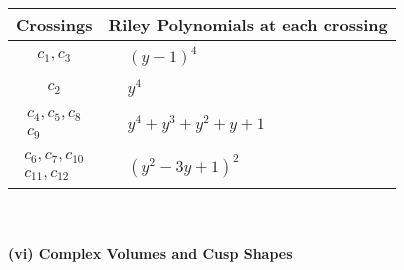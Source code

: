 \documentclass[1p]{elsarticle_modified}
\theoremstyle{definition}
\begin{document}
\begin{tabular}{m{50pt}|m{274pt}}
Crossings & \hspace{64pt}Riley Polynomials at each crossing \\
\hline $$\begin{aligned}c_{1},c_{3}\end{aligned}$$&$\begin{aligned}
&(y-1)^4
\end{aligned}$\\
\hline $$\begin{aligned}c_{2}\end{aligned}$$&$\begin{aligned}
&y^4
\end{aligned}$\\
\hline $$\begin{aligned}c_{4},c_{5},c_{8}\\c_{9}\end{aligned}$$&$\begin{aligned}
&y^4+y^3+y^2+y+1
\end{aligned}$\\
\hline $$\begin{aligned}c_{6},c_{7},c_{10}\\c_{11},c_{12}\end{aligned}$$&$\begin{aligned}
&(y^2-3 y+1)^2
\end{aligned}$\\
\hline
\end{tabular}\\~\\
\newpage\flushleft \textbf{(vi) Complex Volumes and Cusp Shapes}
\end{document}
